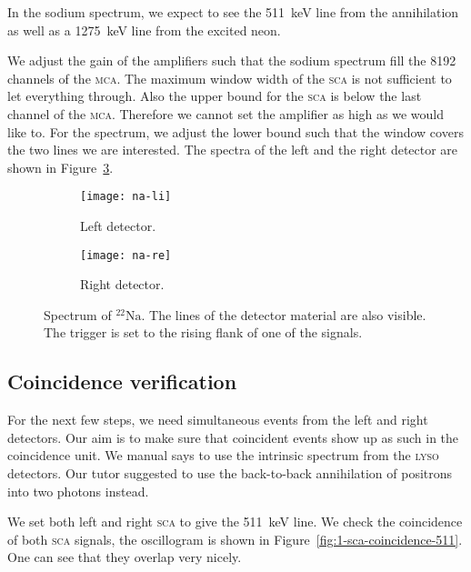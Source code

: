 \documentclass[11pt, english, fleqn, DIV=15, headinclude, BCOR=2cm]{scrreprt}
\begin{document}
In the sodium spectrum, we expect to see the \SI{511}{\kilo\electronvolt} line
from the annihilation as well as a \SI{1275}{\kilo\electronvolt} line from the
excited neon.

We adjust the gain of the amplifiers such that the sodium spectrum fill the
8192 channels of the \textsc{mca}. The maximum window width of the \textsc{sca}
is not sufficient to let everything through. Also the upper bound for the
\textsc{sca} is below the last channel of the \textsc{mca}. Therefore we cannot
set the amplifier as high as we would like to. For the spectrum, we adjust the
lower bound such that the window covers the two lines we are interested. The
spectra of the left and the right detector are shown in
Figure~\ref{fig:natrium}.

\begin{figure}
        \centering
        \begin{subfigure}[c]{.49\linewidth}
                \centering
                \texttt{[image: na-li]}
                \caption{%
                        Left detector.
                }
                \label{fig:na-li}
        \end{subfigure}
        \hfill
        \begin{subfigure}[c]{.49\linewidth}
                \centering
                \texttt{[image: na-re]}
                \caption{%
                        Right detector.
                }
                \label{fig:na-re}
        \end{subfigure}
        \caption{%
                Spectrum of ${}^{22}\text{Na}$. The lines of the detector
                material are also visible. The trigger is set to the rising
                flank of one of the signals.
        }
        \label{fig:natrium}
\end{figure}

\subsection{Coincidence verification}

For the next few steps, we need simultaneous events from the left and right
detectors. Our aim is to make sure that coincident events show up as such in
the coincidence unit. We manual says to use the intrinsic spectrum from the
\textsc{lyso} detectors. Our tutor suggested to use the back-to-back
annihilation of positrons into two photons instead.

We set both left and right \textsc{sca} to give the
\SI{511}{\kilo\electronvolt} line. We check the coincidence of both
\textsc{sca} signals, the oscillogram is shown in
Figure~\ref{fig:1-sca-coincidence-511}. One can see that they overlap very
nicely.
\end{document}
